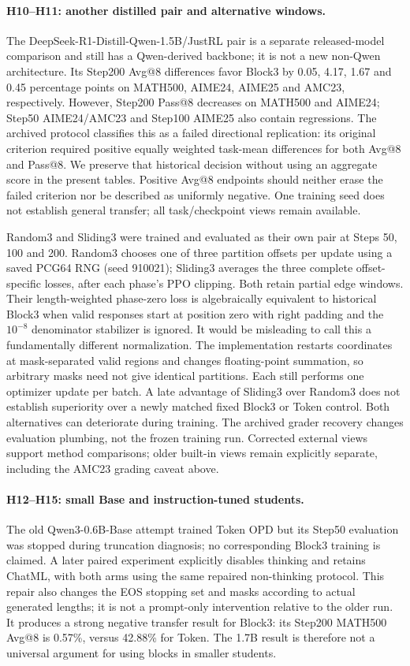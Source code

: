 \paragraph{H10--H11: another distilled pair and alternative windows.}
The DeepSeek-R1-Distill-Qwen-1.5B/JustRL pair is a separate released-model comparison and still has a Qwen-derived backbone; it is not a new non-Qwen architecture. Its Step200 Avg@8 differences favor Block3 by 0.05, 4.17, 1.67 and 0.45 percentage points on MATH500, AIME24, AIME25 and AMC23, respectively. However, Step200 Pass@8 decreases on MATH500 and AIME24; Step50 AIME24/AMC23 and Step100 AIME25 also contain regressions. The archived protocol classifies this as a failed directional replication: its original criterion required positive equally weighted task-mean differences for both Avg@8 and Pass@8. We preserve that historical decision without using an aggregate score in the present tables. Positive Avg@8 endpoints should neither erase the failed criterion nor be described as uniformly negative. One training seed does not establish general transfer; all task/checkpoint views remain available.

Random3 and Sliding3 were trained and evaluated as their own pair at Steps 50, 100 and 200. Random3 chooses one of three partition offsets per update using a saved PCG64 RNG (seed 910021); Sliding3 averages the three complete offset-specific losses, after each phase's PPO clipping. Both retain partial edge windows. Their length-weighted phase-zero loss is algebraically equivalent to historical Block3 when valid responses start at position zero with right padding and the $10^{-8}$ denominator stabilizer is ignored. It would be misleading to call this a fundamentally different normalization. The implementation restarts coordinates at mask-separated valid regions and changes floating-point summation, so arbitrary masks need not give identical partitions. Each still performs one optimizer update per batch. A late advantage of Sliding3 over Random3 does not establish superiority over a newly matched fixed Block3 or Token control. Both alternatives can deteriorate during training. The archived grader recovery changes evaluation plumbing, not the frozen training run. Corrected external views support method comparisons; older built-in views remain explicitly separate, including the AMC23 grading caveat above.

\paragraph{H12--H15: small Base and instruction-tuned students.}
The old Qwen3-0.6B-Base attempt trained Token OPD but its Step50 evaluation was stopped during truncation diagnosis; no corresponding Block3 training is claimed. A later paired experiment explicitly disables thinking and retains ChatML, with both arms using the same repaired non-thinking protocol. This repair also changes the EOS stopping set and masks according to actual generated lengths; it is not a prompt-only intervention relative to the older run. It produces a strong negative transfer result for Block3: its Step200 MATH500 Avg@8 is 0.57\%, versus 42.88\% for Token. The 1.7B result is therefore not a universal argument for using blocks in smaller students.

